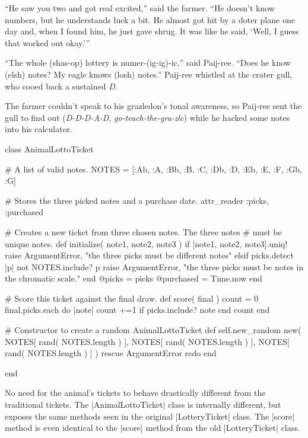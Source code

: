 \documentclass[12pt,twoside]{report}
\begin{document}
``He saw you two and got real excited,'' said the farmer.  ``He
doesn't know numbers, but he understands luck a bit.  He almost got
hit by a doter plane one day and, when I found him, he just gave
shrug.  It was like he said, `Well, I guess that worked out okay.'''

``The whole (shas-op) lottery is numer-(ig-ig)-ic,'' said Paij-ree.
``Does he know (elsh) notes?  My eagle knows (losh) notes.''  Paij-ree
whistled at the crater gull, who cooed back a sustained {\em D}.

The farmer couldn't speak to his grazledon's tonal awareness, so
Paij-ree sent the gull to find out ({\em D-D-D-A-D}, {\em
  go-teach-the-gra-zle}) while he hacked some notes into his
calculator.


\begin{rubycode}

 class AnimalLottoTicket

   # A list of valid notes.
   NOTES = [:Ab, :A, :Bb, :B, :C, :Db, :D, :Eb, :E, :F, :Gb, :G]

   # Stores the three picked notes and a purchase date.
   attr_reader :picks, :purchased

   # Creates a new ticket from three chosen notes.  The three notes
   # must be unique notes.
   def initialize( note1, note2, note3 )
     if [note1, note2, note3].uniq!
       raise ArgumentError, "the three picks must be different notes"
     elsif picks.detect { |p| not NOTES.include? p }
       raise ArgumentError, "the three picks must be notes in the chromatic scale."
     end
     @picks = picks
     @purchased = Time.now
   end

   # Score this ticket against the final draw.
   def score( final )
     count = 0
     final.picks.each do |note|
       count +=1 if picks.include? note
     end
     count
   end

   # Constructor to create a random AnimalLottoTicket
   def self.new_random
     new( NOTES[ rand( NOTES.length ) ], NOTES[ rand( NOTES.length ) ],
          NOTES[ rand( NOTES.length ) ] )
   rescue ArgumentError
     redo
   end

 end

\end{rubycode}


No need for the animal's tickets to behave drastically different from
the traditional tickets.  The
\rubyinline|AnimalLottoTicket| class is internally
different, but exposes the same methods seen in the original
\rubyinline|LotteryTicket| class. The
\rubyinline|score| method is even identical to the
\rubyinline|score| method from the old
\rubyinline|LotteryTicket| class.
\end{document}
